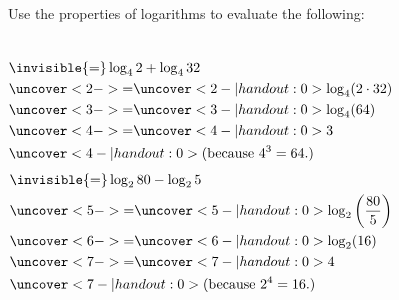 \begin{frame}
\begin{example}%
Use the properties of logarithms to evaluate the following:
\begin{columns}[t]
\begin{align*}
& \invisible{=} \log_4 2 + \log_4 32 \\
&\uncover<2->{=}  \uncover<2-| handout:0>{\log_4 (2\cdot 32 )} \\
&\uncover<3->{=}  \uncover<3-| handout:0>{\log_4 (64)} \\
&\uncover<4->{=}  \uncover<4-| handout:0>{3} \\
& \uncover<4-| handout:0>{\text{(because $4^3 = 64$.)}}
\end{align*}
\begin{align*}
& \invisible{=} \log_2 80 - \log_2 5 \\
&\uncover<5->{=}  \uncover<5-| handout:0>{\log_2 \left( \frac{80}{5}\right) } \\
&\uncover<6->{=}  \uncover<6-| handout:0>{\log_2 (16)} \\
&\uncover<7->{=}  \uncover<7-| handout:0>{4} \\
& \uncover<7-| handout:0>{\text{(because $2^4 = 16$.)}}
\end{align*}
\end{columns}
\end{example}
\end{frame}
